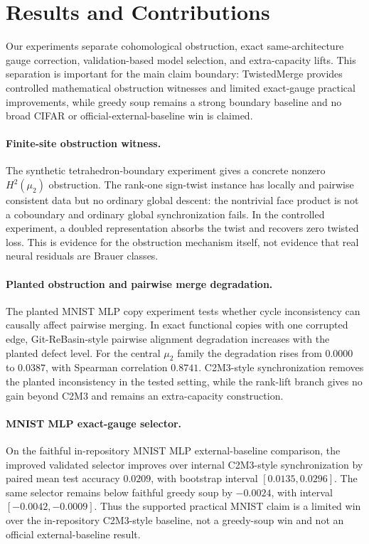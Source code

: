 \section{Results and Contributions}
\label{sec:results-contributions-after-35791f7}

Our experiments separate cohomological obstruction, exact same-architecture gauge correction, validation-based model selection, and extra-capacity lifts. This separation is important for the main claim boundary: TwistedMerge provides controlled mathematical obstruction witnesses and limited exact-gauge practical improvements, while greedy soup remains a strong boundary baseline and no broad CIFAR or official-external-baseline win is claimed.

\paragraph{Finite-site obstruction witness.}
The synthetic tetrahedron-boundary experiment gives a concrete nonzero \(H^2(\mu_2)\) obstruction. The rank-one sign-twist instance has locally and pairwise consistent data but no ordinary global descent: the nontrivial face product is not a coboundary and ordinary global synchronization fails. In the controlled experiment, a doubled representation absorbs the twist and recovers zero twisted loss. This is evidence for the obstruction mechanism itself, not evidence that real neural residuals are Brauer classes.

\paragraph{Planted obstruction and pairwise merge degradation.}
The planted MNIST MLP copy experiment tests whether cycle inconsistency can causally affect pairwise merging. In exact functional copies with one corrupted edge, Git-ReBasin-style pairwise alignment degradation increases with the planted defect level. For the central \(\mu_2\) family the degradation rises from \(0.0000\) to \(0.0387\), with Spearman correlation \(0.8741\). C2M3-style synchronization removes the planted inconsistency in the tested setting, while the rank-lift branch gives no gain beyond C2M3 and remains an extra-capacity construction.

\paragraph{MNIST MLP exact-gauge selector.}
On the faithful in-repository MNIST MLP external-baseline comparison, the improved validated selector improves over internal C2M3-style synchronization by paired mean test accuracy \(0.0209\), with bootstrap interval \([0.0135,0.0296]\). The same selector remains below faithful greedy soup by \(-0.0024\), with interval \([-0.0042,-0.0009]\). Thus the supported practical MNIST claim is a limited win over the in-repository C2M3-style baseline, not a greedy-soup win and not an official external-baseline result.

